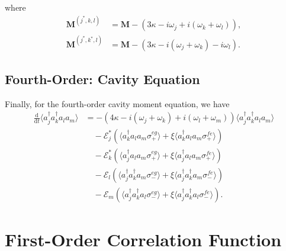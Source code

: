 \documentclass{article}
\newcommand{\ddt}{\frac{\mathrm{d}}{\mathrm{d}t}}
\begin{document}
where
\begin{subequations}
\begin{align}
	\bm{M}^{(j^{*}, k, l)} &= \bm{M} - \left( 3 \kappa - i \omega_{j} + i \left( \omega_{k} + \omega_{l} \right) \right), \\
	\bm{M}^{(j^{*}, k^{*}, l)} &= \bm{M} - \left( 3 \kappa - i \left( \omega_{j} + \omega_{k} \right) - i \omega_{l} \right).
\end{align}
\end{subequations}

\subsection{Fourth-Order: Cavity Equation}

Finally, for the fourth-order cavity moment equation, we have
\begin{align}
	\ddt \langle a^{\dagger}_{j} a^{\dagger}_{k} a_{l} a_{m} \rangle &= -\left( 4 \kappa - i \left( \omega_{j} + \omega_{k} \right) + i \left( \omega_{l} + \omega_{m} \right) \right) \langle a^{\dagger}_{j} a^{\dagger}_{k} a_{l} a_{m} \rangle \nonumber \\
	&\quad - \mathcal{E}_{j}^{*} \left( \langle a^{\dagger}_{k} a_{l} a_{m} \sigma^{eg}_{+} \rangle + \xi \langle a^{\dagger}_{k} a_{l} a_{m} \sigma^{fe}_{+} \rangle \right) \nonumber \\
	&\quad - \mathcal{E}_{k}^{*} \left( \langle a^{\dagger}_{j} a_{l} a_{m} \sigma^{eg}_{+} \rangle + \xi \langle a^{\dagger}_{j} a_{l} a_{m} \sigma^{fe}_{+} \rangle \right) \nonumber \\
	&\quad - \mathcal{E}_{l} \left( \langle a^{\dagger}_{j} a^{\dagger}_{k} a_{m} \sigma^{eg}_{-} \rangle + \xi \langle a^{\dagger}_{j} a^{\dagger}_{k} a_{m} \sigma^{fe}_{-} \rangle \right) \nonumber \\
	&\quad - \mathcal{E}_{m} \left( \langle a^{\dagger}_{j} a^{\dagger}_{k} a_{l} \sigma^{eg}_{-} \rangle + \xi \langle a^{\dagger}_{j} a^{\dagger}_{k} a_{l} \sigma^{fe}_{-} \rangle \right).
\end{align}

\section{First-Order Correlation Function}
\end{document}

